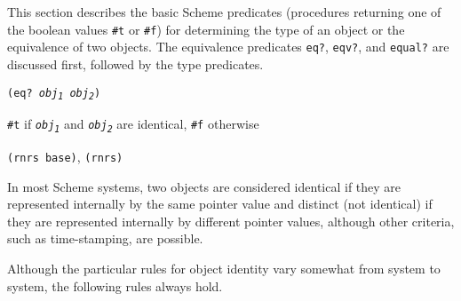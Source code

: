 This section describes the basic Scheme \label{objects_s6}predicates (procedures
returning one of the boolean values \label{objects_s7}\texttt{\#{}t} or \label{objects_s8}\texttt{\#{}f}) for
determining the type of an object or the equivalence of two objects.
The \label{objects_s9}equivalence predicates \texttt{eq?}, \texttt{eqv?}, and \texttt{equal?}
are discussed first, followed by the type predicates.

\begin{description}

\label{objects_s10}\item[procedure] \texttt{(eq? \textit{obj\textsubscript{1}} \textit{obj\textsubscript{2}})}



\item[returns] \texttt{\#{}t} if \texttt{\textit{obj\textsubscript{1}}} and \texttt{\textit{obj\textsubscript{2}}} are identical, \texttt{\#{}f} otherwise


\item[libraries] \texttt{(rnrs base)}, \texttt{(rnrs)}
\end{description}


In most Scheme systems, two objects are considered identical if they
are represented internally by the same pointer value and distinct
(not identical) if they are represented internally by different pointer
values, although other criteria, such as time-stamping, are possible.


Although the particular rules for \label{objects_s11}object identity
vary somewhat from system to system, the following rules always hold.

